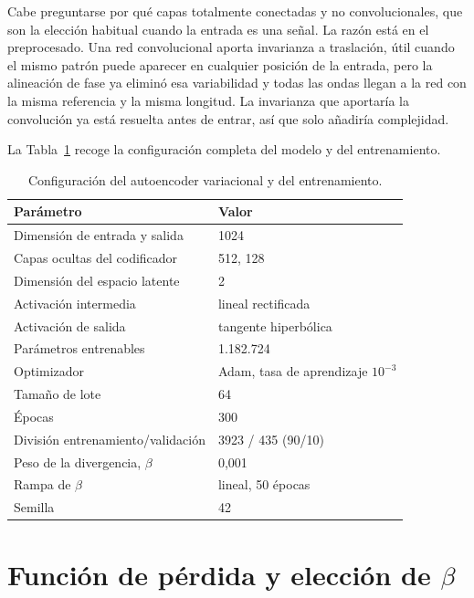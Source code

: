 Cabe preguntarse por qué capas totalmente conectadas y no convolucionales, que
son la elección habitual cuando la entrada es una señal. La razón está en el
preprocesado. Una red convolucional aporta invarianza a traslación, útil cuando
el mismo patrón puede aparecer en cualquier posición de la entrada, pero la
alineación de fase ya eliminó esa variabilidad y todas las ondas llegan a la red
con la misma referencia y la misma longitud. La invarianza que aportaría la
convolución ya está resuelta antes de entrar, así que solo añadiría
complejidad.

La Tabla~\ref{tab:vae} recoge la configuración completa del modelo y del
entrenamiento.

\begin{table}[htbp]
    \centering
    \caption{Configuración del autoencoder variacional y del entrenamiento.}
    \label{tab:vae}
    \begin{tabular}{ll}
        \toprule
        \textbf{Parámetro} & \textbf{Valor} \\
        \midrule
        Dimensión de entrada y salida & 1024 \\
        Capas ocultas del codificador & 512, 128 \\
        Dimensión del espacio latente & 2 \\
        Activación intermedia & lineal rectificada \\
        Activación de salida & tangente hiperbólica \\
        Parámetros entrenables & 1.182.724 \\
        \midrule
        Optimizador & Adam, tasa de aprendizaje $10^{-3}$ \\
        Tamaño de lote & 64 \\
        Épocas & 300 \\
        División entrenamiento/validación & 3923 / 435 (90/10) \\
        Peso de la divergencia, $\beta$ & 0,001 \\
        Rampa de $\beta$ & lineal, 50 épocas \\
        Semilla & 42 \\
        \bottomrule
    \end{tabular}
\end{table}

\section{Función de pérdida y elección de \texorpdfstring{$\beta$}{beta}}
\label{sec:beta}


